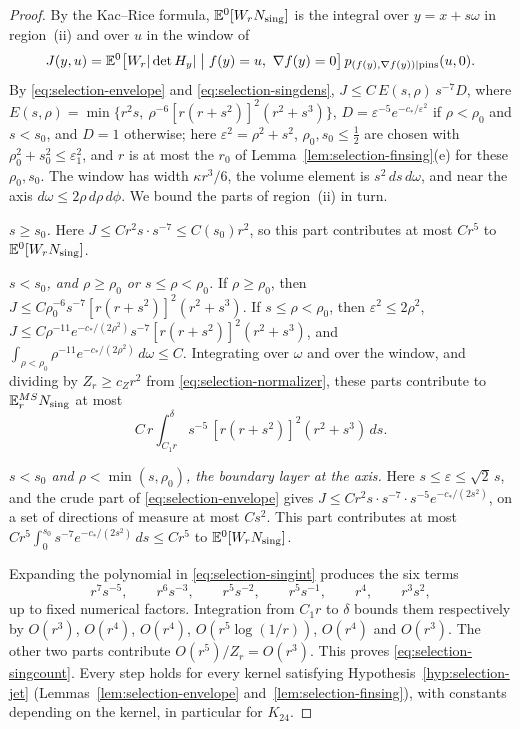 \begin{proof}
By the Kac--Rice formula, $\mathbb E^0[W_rN_{\rm sing}]$ is the integral over $y=x+s\omega$ in region~(ii) and over $u$ in the window of
\[
J(y,u)=\mathbb E^0\bigl[W_r|\det H_y|\bigm|f(y)=u,\ \nabla f(y)=0\bigr]\,p_{(f(y),\nabla f(y))\mid\text{pins}}(u,0).
\]
By \eqref{eq:selection-envelope} and \eqref{eq:selection-singdens}, $J\le C\,E(s,\rho)\,s^{-7}D$, where $E(s,\rho)=\min\{r^2s,\ \rho^{-6}[r(r+s^2)]^2(r^2+s^3)\}$, $D=\varepsilon^{-5}e^{-c_*/\varepsilon^2}$ if $\rho<\rho_0$ and $s<s_0$, and $D=1$ otherwise; here $\varepsilon^2=\rho^2+s^2$, $\rho_0,s_0\le\frac12$ are chosen with $\rho_0^2+s_0^2\le\varepsilon_1^2$, and $r$ is at most the $r_0$ of Lemma~\ref{lem:selection-finsing}(e) for these $\rho_0,s_0$. The window has width $\kappa r^3/6$, the volume element is $s^2\,ds\,d\omega$, and near the axis $d\omega\le2\rho\,d\rho\,d\phi$. We bound the parts of region~(ii) in turn.

\emph{$s\ge s_0$.} Here $J\le Cr^2s\cdot s^{-7}\le C(s_0)r^2$, so this part contributes at most $Cr^5$ to $\mathbb E^0[W_rN_{\rm sing}]$.

\emph{$s<s_0$, and $\rho\ge\rho_0$ or $s\le\rho<\rho_0$.} If $\rho\ge\rho_0$, then $J\le C\rho_0^{-6}s^{-7}[r(r+s^2)]^2(r^2+s^3)$. If $s\le\rho<\rho_0$, then $\varepsilon^2\le2\rho^2$, $J\le C\rho^{-11}e^{-c_*/(2\rho^2)}s^{-7}[r(r+s^2)]^2(r^2+s^3)$, and $\int_{\rho<\rho_0}\rho^{-11}e^{-c_*/(2\rho^2)}\,d\omega\le C$. Integrating over $\omega$ and over the window, and dividing by $Z_r\ge c_Zr^2$ from \eqref{eq:selection-normalizer}, these parts contribute to $\mathbb E^{MS}_rN_{\rm sing}$ at most
\begin{equation}\label{eq:selection-singint}
C\,r\int_{C_1r}^{\delta}s^{-5}\,[r(r+s^2)]^2(r^2+s^3)\,ds .
\end{equation}

\emph{$s<s_0$ and $\rho<\min(s,\rho_0)$, the boundary layer at the axis.} Here $s\le\varepsilon\le\sqrt2\,s$, and the crude part of \eqref{eq:selection-envelope} gives $J\le Cr^2s\cdot s^{-7}\cdot s^{-5}e^{-c_*/(2s^2)}$, on a set of directions of measure at most $Cs^2$. This part contributes at most $Cr^5\int_0^{s_0}s^{-7}e^{-c_*/(2s^2)}\,ds\le Cr^5$ to $\mathbb E^0[W_rN_{\rm sing}]$.

Expanding the polynomial in \eqref{eq:selection-singint} produces the six terms
\begin{equation}\label{eq:selection-sixterms}
r^7s^{-5},\qquad r^6s^{-3},\qquad r^5s^{-2},\qquad r^5s^{-1},\qquad r^4,\qquad r^3s^2,
\end{equation}
up to fixed numerical factors. Integration from $C_1r$ to $\delta$ bounds them respectively by $O(r^3)$, $O(r^4)$, $O(r^4)$, $O(r^5\log(1/r))$, $O(r^4)$ and $O(r^3)$. The other two parts contribute $O(r^5)/Z_r=O(r^3)$. This proves \eqref{eq:selection-singcount}. Every step holds for every kernel satisfying Hypothesis~\ref{hyp:selection-jet} (Lemmas~\ref{lem:selection-envelope} and~\ref{lem:selection-finsing}), with constants depending on the kernel, in particular for $K_{24}$.
\end{proof}

